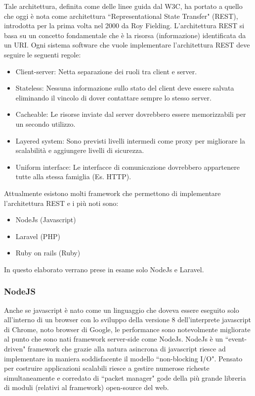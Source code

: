 Tale architettura, definita come delle linee guida dal W3C, ha portato a quello che oggi è nota come architettura ``Representational State Transfer" (REST), introdotta per la prima volta nel 2000 da Roy Fielding. L'architettura REST si basa su un concetto fondamentale che è la risorsa (informazione) identificata da un URI. Ogni sistema software che vuole implementare l'architettura REST deve seguire le seguenti regole:
\begin{itemize}
	\item Client-server: Netta separazione dei ruoli tra client e server.
	\item Stateless: Nessuna informazione sullo stato del client deve essere salvata eliminando il vincolo di dover contattare sempre lo stesso server.
	\item Cacheable: Le risorse inviate dal server dovrebbero essere memorizzabili per un secondo utilizzo.
	\item Layered system: Sono previsti livelli intermedi come proxy per migliorare la scalabilità e aggiungere livelli di sicurezza.
	\item Uniform interface: Le interfacce di comunicazione dovrebbero appartenere tutte alla stessa famiglia (Es. HTTP).
\end{itemize}

Attualmente esistono molti framework che permettono di implementare l'architettura REST e i più noti sono:
\begin{itemize}
	\item NodeJs (Javascript)
	\item Laravel (PHP)
	\item Ruby on rails (Ruby)
\end{itemize}
In questo elaborato verrano prese in esame solo NodeJs e Laravel.


\subsubsection{NodeJS}
Anche se javascript è nato come un linguaggio che doveva essere eseguito solo all'interno di un browser con lo sviluppo della versione 8 dell'interprete javascript di Chrome, noto browser di Google, le performance sono notevolmente migliorate al punto che sono nati framework server-side come NodeJs. NodeJs è un ``event-driven" framework che grazie alla natura asincrona di javascript riesce ad implementare in maniera soddisfacente il modello ``non-blocking I/O". Pensato per costruire applicazioni scalabili riesce a gestire numerose richeste simultaneamente e corredato di ``packet manager" gode della più grande libreria di moduli (relativi al framework) open-source del web.


